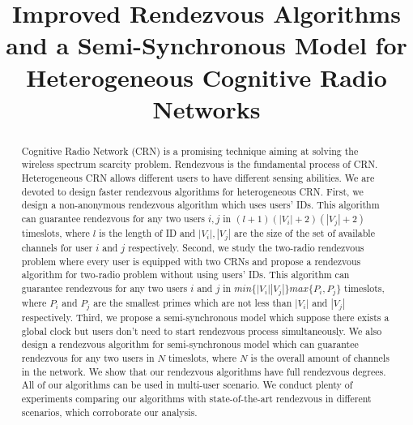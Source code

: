 \documentclass[10pt, conference, letterpaper]{IEEEtran}
\begin{document}


\title{Improved Rendezvous Algorithms and a Semi-Synchronous Model for Heterogeneous Cognitive Radio Networks}

%

\maketitle


\begin{abstract}
Cognitive Radio Network (CRN) is a promising technique aiming at solving the wireless spectrum scarcity problem. Rendezvous is the fundamental process of CRN. Heterogeneous CRN allows different users to have different sensing abilities. We are devoted to design faster rendezvous algorithms for heterogeneous CRN. First, we design a non-anonymous rendezvous algorithm which uses users' IDs. This algorithm can guarantee rendezvous for any two users $i,j$ in $(l+1)(|V_i|+2)(|V_j|+2)$ timeslots, where $l$ is the length of ID and $|V_i|,|V_j|$ are the size of the set of available channels for user $i$ and $j$ respectively. Second, we study the two-radio rendezvous problem where every user is equipped with two CRNs and propose a rendezvous algorithm for two-radio problem without using users' IDs. This algorithm can guarantee rendezvous for any two users $i$ and $j$ in $min\{|V_i||V_j|\}max\{P_i,P_j\}$ timeslots, where $P_i$ and $P_j$ are the smallest primes which are not less than $|V_i|$ and $|V_j|$ respectively. Third, we propose a semi-synchronous model which suppose there exists a global clock but users don't need to start rendezvous process simultaneously. We also design a rendezvous algorithm for semi-synchronous model which can guarantee rendezvous for any two users in $N$ timeslots, where $N$ is the overall amount of channels in the network. We show that our rendezvous algorithms have full rendezvous degrees. All of our algorithms can be used in multi-user scenario. We conduct plenty of experiments comparing our algorithms with state-of-the-art rendezvous in different scenarios, which corroborate our analysis.
\end{abstract}
\end{document}
